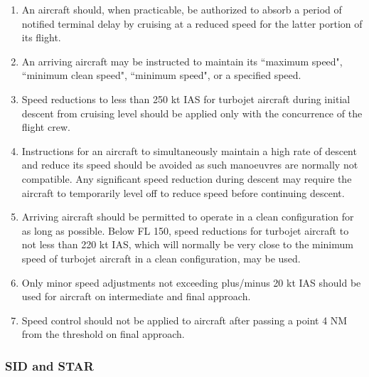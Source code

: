 \documentclass[../vATM.tex]{subfiles}
\begin{document}
    \begin{enumerate}
        \item An aircraft should, when practicable, be authorized to absorb a period of notified terminal delay by cruising at a reduced speed for the latter portion of its flight.
        \item An arriving aircraft may be instructed to maintain its ``maximum speed", ``minimum clean speed", ``minimum speed", or a specified speed.

        
        \item Speed reductions to less than 250 kt IAS for turbojet aircraft during initial descent from cruising level should be applied only with the concurrence of the flight crew.
        \item Instructions for an aircraft to simultaneously maintain a high rate of descent and reduce its speed should be avoided as such manoeuvres are normally not compatible. Any significant speed reduction during descent may require the aircraft to temporarily level off to reduce speed before continuing descent.
        \item Arriving aircraft should be permitted to operate in a clean configuration for as long as possible. Below FL 150, speed reductions for turbojet aircraft to not less than 220 kt IAS, which will normally be very close to the minimum speed of turbojet aircraft in a clean configuration, may be used.
        \item Only minor speed adjustments not exceeding plus/minus 20 kt IAS should be used for aircraft on intermediate and final approach.
        \item Speed control should not be applied to aircraft after passing a point 4 NM from the threshold on final approach.

    \end{enumerate}

    \subsubsection{SID and STAR}
\end{document}
